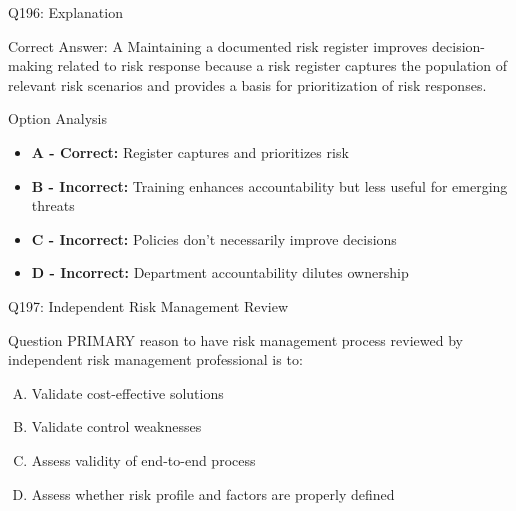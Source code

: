 \documentclass{beamer}
\begin{document}
	\begin{frame}{Q196: Explanation}
		\begin{block}{Correct Answer: A}
			Maintaining a documented risk register improves decision-making related to risk response because a risk register captures the population of relevant risk scenarios and provides a basis for prioritization of risk responses.
		\end{block}
		\begin{block}{Option Analysis}
			\begin{itemize}
				\item \textbf{A - Correct:} Register captures and prioritizes risk
				\item \textbf{B - Incorrect:} Training enhances accountability but less useful for emerging threats
				\item \textbf{C - Incorrect:} Policies don't necessarily improve decisions
				\item \textbf{D - Incorrect:} Department accountability dilutes ownership
			\end{itemize}
		\end{block}
	\end{frame}
	
	\begin{frame}{Q197: Independent Risk Management Review}
		\begin{block}{Question}
			PRIMARY reason to have risk management process reviewed by independent risk management professional is to:
		\end{block}
		\begin{enumerate}[(A)]
			\item Validate cost-effective solutions
			\item Validate control weaknesses
			\item Assess validity of end-to-end process
			\item Assess whether risk profile and factors are properly defined
		\end{enumerate}
	\end{frame}
	
\end{document}
